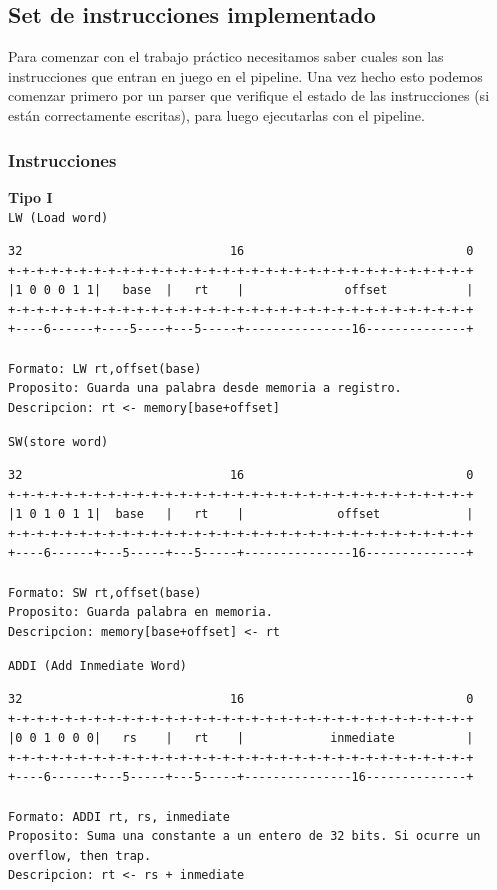 \subsection{Set de instrucciones implementado}

Para comenzar con el trabajo pr\'actico necesitamos saber cuales son las instrucciones que entran en juego en el pipeline. Una vez hecho esto podemos comenzar primero por un parser que verifique el estado de las instrucciones (si están correctamente escritas), para luego ejecutarlas con el pipeline.

\subsubsection{Instrucciones}
\textbf{Tipo I}\\

\texttt{LW (Load word)}

\begin{lstlisting}[style=consola]
32                             16                               0
+-+-+-+-+-+-+-+-+-+-+-+-+-+-+-+-+-+-+-+-+-+-+-+-+-+-+-+-+-+-+-+-+
|1 0 0 0 1 1|   base  |   rt    |              offset           |
+-+-+-+-+-+-+-+-+-+-+-+-+-+-+-+-+-+-+-+-+-+-+-+-+-+-+-+-+-+-+-+-+
+----6------+----5----+---5-----+---------------16--------------+

Formato: LW rt,offset(base)
Proposito: Guarda una palabra desde memoria a registro.
Descripcion: rt <- memory[base+offset]
\end{lstlisting}

\texttt{SW(store word)}

\begin{lstlisting}[style=consola]
32                             16                               0
+-+-+-+-+-+-+-+-+-+-+-+-+-+-+-+-+-+-+-+-+-+-+-+-+-+-+-+-+-+-+-+-+
|1 0 1 0 1 1|  base   |   rt    |             offset            |
+-+-+-+-+-+-+-+-+-+-+-+-+-+-+-+-+-+-+-+-+-+-+-+-+-+-+-+-+-+-+-+-+
+----6------+---5-----+---5-----+---------------16--------------+

Formato: SW rt,offset(base)
Proposito: Guarda palabra en memoria.
Descripcion: memory[base+offset] <- rt
\end{lstlisting}

\texttt{ADDI (Add Inmediate Word)}

\begin{lstlisting}[style=consola]
32                             16                               0
+-+-+-+-+-+-+-+-+-+-+-+-+-+-+-+-+-+-+-+-+-+-+-+-+-+-+-+-+-+-+-+-+
|0 0 1 0 0 0|   rs    |   rt    |            inmediate          |
+-+-+-+-+-+-+-+-+-+-+-+-+-+-+-+-+-+-+-+-+-+-+-+-+-+-+-+-+-+-+-+-+
+----6------+---5-----+---5-----+---------------16--------------+

Formato: ADDI rt, rs, inmediate
Proposito: Suma una constante a un entero de 32 bits. Si ocurre un overflow, then trap.
Descripcion: rt <- rs + inmediate
\end{lstlisting}

